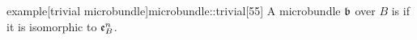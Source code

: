 \begin{mystatement}{example}[trivial microbundle]{microbundle::trivial}[55] A microbundle $\bb$ over $B$ is  if it is isomorphic to $\mathfrak{e}^{n}_{B}$. \end{mystatement}